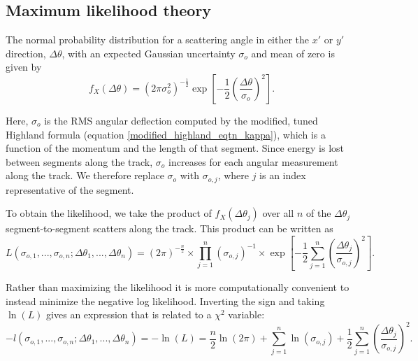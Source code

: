 \documentclass[a4paper,11pt]{article}
\begin{document}
\subsection{Maximum likelihood theory}\label{likelihood_theory_section}

The normal probability distribution for a scattering angle in either the $x'$ or $y'$ direction, $\Delta\theta$, with an expected Gaussian uncertainty $\sigma_o$ and mean of zero is given by
\begin{equation}
f_X(\Delta\theta) = (2\pi\sigma_o^2)^{-\frac{1}{2}}\exp\left[-\frac{1}{2}\left(\frac{\Delta\theta}{\sigma_o}\right)^2\right].
\end{equation}

Here, $\sigma_o$ is the RMS angular deflection computed by the modified, tuned Highland formula (equation \ref{modified_highland_eqtn_kappa}), which is a function of the momentum and the length of that segment. Since energy is lost between segments along the track, $\sigma_o$ increases for each angular measurement along the track. We therefore replace $\sigma_o$ with $\sigma_{o,j}$, where $j$ is an index representative of the segment. \newline

To obtain the likelihood, we take the product of $f_X(\Delta\theta_j)$ over all $n$ of the $\Delta\theta_j$ segment-to-segment scatters along the track. This product can be written as
\begin{equation}
L(\sigma_{o,1},...,\sigma_{o,n};\Delta\theta_1,...,\Delta\theta_n) = (2\pi)^{-\frac{n}{2}}\times\prod_{j=1}^{n}(\sigma_{o,j})^{-1} \times \exp\left[-\frac{1}{2}\sum_{j=1}^{n}\left(\frac{\Delta\theta_j}{\sigma_{o,j}}\right)^2\right].
\end{equation}

Rather than maximizing the likelihood it is more computationally convenient to instead minimize the negative log likelihood. Inverting the sign and taking $\ln(L)$ gives an expression that is related to a $\chi^2$ variable:
\begin{equation}\label{leo_llhd_eqtn}
-l(\sigma_{o,1},...,\sigma_{o,n};\Delta\theta_1,...,\Delta\theta_n) = -\ln(L) = \frac{n}{2}\ln(2\pi) + \sum_{j=1}^{n}\ln(\sigma_{o,j}) + \frac{1}{2}\sum_{j=1}^{n}\left(\frac{\Delta\theta_j}{\sigma_{o,j}}\right)^2.
\end{equation}

\end{document}
